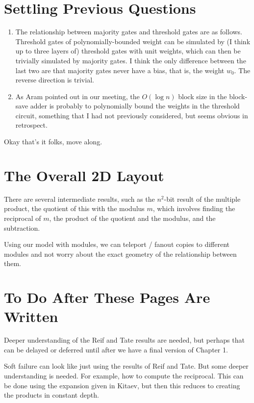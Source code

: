 \documentclass{article}
\begin{document}
\section{Settling Previous Questions}

\begin{enumerate}
\item
The relationship between majority gates and threshold gates are as follows.
Threshold gates of polynomially-bounded weight can be simulated by
(I think up to three layers of) threshold gates with unit weights, which
can then be trivially simulated by majority gates. I think the only 
difference between the last two are that majority gates never have a bias,
that is, the weight $w_0$. The reverse direction is trivial.

\item
As Aram pointed out in our meeting, the $O(\log n)$ block size in the
block-save adder is probably to polynomially bound the weights in the
threshold circuit, something that I had not previously considered, but
seems obvious in retrospect.

\end{enumerate}

Okay that's it folks, move along.

\section{The Overall 2D Layout}

There are several intermediate results, such as the $n^2$-bit result of the
multiple product, the quotient of this with the modulus $m$, which involves
finding the reciprocal of $m$, the product of
the quotient and the modulus, and the subtraction.

Using our model with modules, we can teleport / fanout copies to different
modules and not worry about the exact geometry of the relationship between
them.

\section{To Do After These Pages Are Written}

Deeper understanding of the Reif and Tate results are needed, but perhaps
that can be delayed or deferred until after we have a final version of
Chapter 1.

Soft failure can look like just using the results of Reif and Tate.
But some deeper understanding is needed. For example, how to compute the
reciprocal. This can be done using the expansion given in Kitaev, but
then this reduces to creating the products in constant depth.
\end{document}
